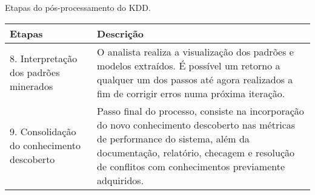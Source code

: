 \begin{quadro}[!htb]
    \centering
    \caption{Etapas do pós-processamento do KDD.\label{qua:etapasPosProcKDD}}
    \begin{tabular}{|p{7cm}|p{7cm}|}
        \hline
        \textbf{Etapas} & \textbf{Descrição} \\
        \hline
        8. Interpretação dos padrões minerados & O analista realiza a visualização dos padrões e modelos extraídos. É possível um retorno a qualquer um dos passos até agora realizados a fim de corrigir erros numa próxima iteração. \\ \hline
        9. Consolidação do conhecimento descoberto & Passo final do processo, consiste na incorporação do novo conhecimento descoberto nas métricas de performance do sistema, além da documentação, relatório, checagem e resolução de conflitos com conhecimentos previamente adquiridos. \\
        \hline
    \end{tabular}
\end{quadro}